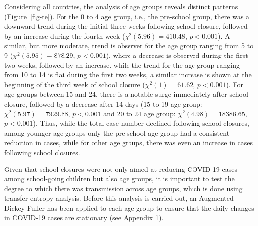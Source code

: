 \documentclass[
  number]{elsarticle}
\begin{document}
Considering all countries, the analysis of age groups reveals distinct
patterns (Figure~\ref{fig-te}). For the 0 to 4 age group, i.e., the
pre-school group, there was a downward trend during the initial three
weeks following school closure, followed by an increase during the
fourth week (\(\chi^2(5.96) = 410.48\), \(p < 0.001\)). A similar, but
more moderate, trend is observer for the age group ranging from 5 to 9
(\(\chi^2(5.95) = 878.29\), \(p < 0.001\)), where a decrease is observed
during the first two weeks, followed by an increase. while the trend for
the age group ranging from 10 to 14 is flat during the first two weeks,
a similar increase is shown at the beginning of the third week of school
closure (\(\chi^2(1) = 61.62\), \(p < 0.001\)). For age groups between
15 and 24, there is a notable surge immediately after school closure,
followed by a decrease after 14 days (15 to 19 age group:
\(\chi^2(5.97) = 7929.88\), \(p < 0.001\) and 20 to 24 age group:
\(\chi^2(4.98) = 18386.65\), \(p < 0.001\)). Thus, while the total case
number declined following school closures, among younger age groups only
the pre-school age group had a consistent reduction in cases, while for
other age groups, there was even an increase in cases following school
closures.

Given that school closures were not only aimed at reducing COVID-19
cases among school-going children but also age groups, it is important
to test the degree to which there was transmission across age groups,
which is done using transfer entropy analysis. Before this analysis is
carried out, an Augmented Dickey-Fuller has been applied to each age
group to ensure that the daily changes in COVID-19 cases are stationary
(see Appendix 1).
\end{document}
